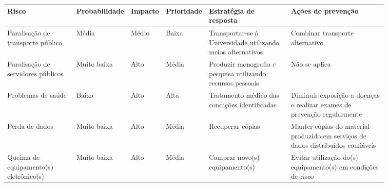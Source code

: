 \documentclass{ufsctex/ufsctex}
\begin{document}
\begin{figure}[htbp]
  \footnotesize
    \begin{tabular}{|P{1.3cm}|*{3}{P{0.8cm}|}*{2}{P{2.24cm}|}}
    \hline {}
    \textbf{Risco} & \textbf{Proba\-bilidade} & \textbf{Impacto}
      & \textbf{Priori\-dade} & \textbf{Estratégia de resposta}
      & \textbf{Ações de prevenção} \\
    \hline Paralisação de transporte público & Média & Médio & Baixa
      & Transportar-se à Universidade utilizando meios alternativos
      & Combinar transporte alternativo \\
    \hline Paralisação de servidores públicos & Muito baixa & Alto & Média
      & Produzir monografia e pesquisa utilizando recursos pessoais
      & Não se aplica \\
    \hline Problemas de saúde & Baixa & Alto & Alta
      & Tratamento médico das condições identificadas
      & Diminuir exposição a doenças e realizar exames de prevenção
        regularmente \\
    \hline Perda de dados & Muito baixa & Alto & Média
      & Recuperar cópias
      & Manter cópias do material produzido em serviços de dados distribuídos
        confiáveis \\
    \hline Queima de equipamento(s) eletrônico(s) & Muito baixa & Alto & Média
      & Comprar novo(s) equipamento(s)
      & Evitar utilização do(s) equipamento(s) em condições de risco \\
    \hline
  \end{tabular}
\end{figure}



\end{document}
